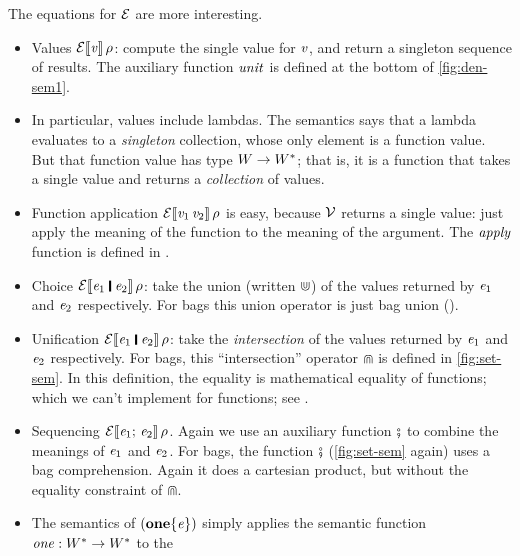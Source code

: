 The equations for $\mathcal{E}$ are more interesting.
\begin{itemize}
\item Values $\mathcal{E}\llbracket \mathit{v} \rrbracket\, \rho$: compute the single value for \ensuremath{\Varid{v}}, and return a singleton sequence of results.
The auxiliary function $\mathit{unit}$ is defined at the bottom of \cref{fig:den-sem1}.
\item In particular, values include lambdas.  The semantics says that a lambda evaluates to a \emph{singleton}
collection, whose only element is a function value. But that function value has
type $W \rightarrow W^{*}$; that is, it is a function that takes a single
value and returns a \emph{collection} of values.
\item Function application $\mathcal{E}\llbracket \mathit{v}_{\mathrm{1}}\,\mathit{v}_{\mathrm{2}} \rrbracket\, \rho$ is easy, because $\mathcal{V}$ returns a single value: just apply
  the meaning of the function to the meaning of the argument.  The $\mathit{apply}$ function is defined in .
\item Choice $\semapp{E}{\ensuremath{\Varid{e}_{\mathrm{1}}\;\rule[-0.1em]{0.15em}{0.75em}\;\Varid{e}_{\mathrm{2}}}}{\rho}$: take the union (written $\Cup$) of the values
  returned by \ensuremath{\Varid{e}_{\mathrm{1}}} and \ensuremath{\Varid{e}_{\mathrm{2}}} respectively.  For bags this union operator is just bag union ().
\item Unification $\semapp{E}{\ensuremath{\Varid{e}_{\mathrm{1}}\;\rule[-0.1em]{0.15em}{0.75em}\;\Varid{e}_{\mathrm{2}}}}{\rho}$: take the \emph{intersection} of the
  values returned by \ensuremath{\Varid{e}_{\mathrm{1}}} and \ensuremath{\Varid{e}_{\mathrm{2}}} respectively. For bags, this ``intersection'' operator $\Cap$
  is defined in \cref{fig:set-sem}. In this definition, the equality is mathematical equality of functions;
  which we can't implement for functions; see .
\item Sequencing $\mathcal{E}\llbracket \mathit{e}_{\mathrm{1}};\,\mathit{e}_{\mathrm{2}} \rrbracket\, \rho$. Again we use an auxiliary function $\fatsemi$ to combine
  the meanings of \ensuremath{\Varid{e}_{\mathrm{1}}} and \ensuremath{\Varid{e}_{\mathrm{2}}}. For bags, the function $\fatsemi$ (\cref{fig:set-sem} again)
  uses a bag comprehension.  Again it does a cartesian product, but without the equality constraint of $\Cap$.
\item The semantics of \ensuremath{(\textbf{one}\{\Varid{e}\})} simply applies the semantic function $\mathit{one} : W^{*} \rightarrow W^{*}$ to the

\end{itemize}

